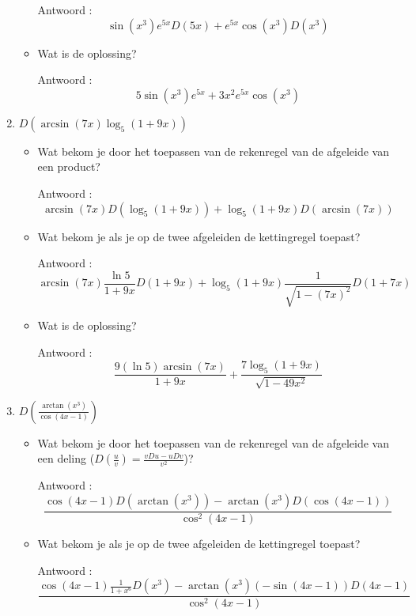 \begin{enumerate}
\begin{itemize}
		Antwoord : \[\sin \left( x^3  \right)e^{5x}D(5x)+e^{5x}\cos \left(  x^3 \right)D \left( x^3 \right)\]
		
		\item Wat is de oplossing?
		
		Antwoord : \[5\sin \left( x^3  \right)e^{5x}+3x^2e^{5x}\cos \left(  x^3 \right)\]
		
	\end{itemize}
	
	\item $D \left( \arcsin (7x)\log_5 (1+9x)   \right)$
	
	\begin{itemize}
		
		\item Wat bekom je door het toepassen van de rekenregel van de afgeleide van een product?
		
		Antwoord : \[\arcsin (7x)D \left( \log_5(1+9x)  \right)+\log_5(1+9x)D \left(  \arcsin(7x)  \right)\]
		
		\item Wat bekom je als je op de twee afgeleiden de kettingregel toepast?
		
		Antwoord :  \[\arcsin (7x)\frac{\ln 5}{1+9x}D(1+9x)+\log_5(1+9x)\frac{1}{\sqrt{1-(7x)^2}}D(1+7x)\]
		
		\item Wat is de oplossing?
		
		Antwoord : \[\frac{9 \left( \ln 5  \right)\arcsin (7x)}{1+9x}+\frac{7\log_5(1+9x)}{\sqrt{1-49x^2}}\]
		
	\end{itemize}
	
	\item $D \left( \frac{\arctan \left( x^3  \right)}{\cos (4x-1)}  \right)$
	
	\begin{itemize}
		
		\item Wat bekom je door het toepassen van de rekenregel van de afgeleide van een deling ($D \left(  \frac{u}{v} \right)=\frac {vDu-uDv}{v^2}$)?
		
		Antwoord : \[\frac {\cos (4x-1) D \left(  \arctan \left( x^3 \right)  \right)-\arctan \left( x^3 \right)D\left( \cos (4x-1)  \right)}{\cos ^2(4x-1)}\]
		
		\item Wat bekom je als je op de twee afgeleiden de kettingregel toepast?
		
		Antwoord : \[\frac {\cos (4x-1) \frac{1}{1+x^6}D\left( x^3 \right)-\arctan \left( x^3 \right)\left(- \sin (4x-1)  \right)D(4x-1)}{\cos ^2(4x-1)}\]
		

\end{itemize}
\end{enumerate}
